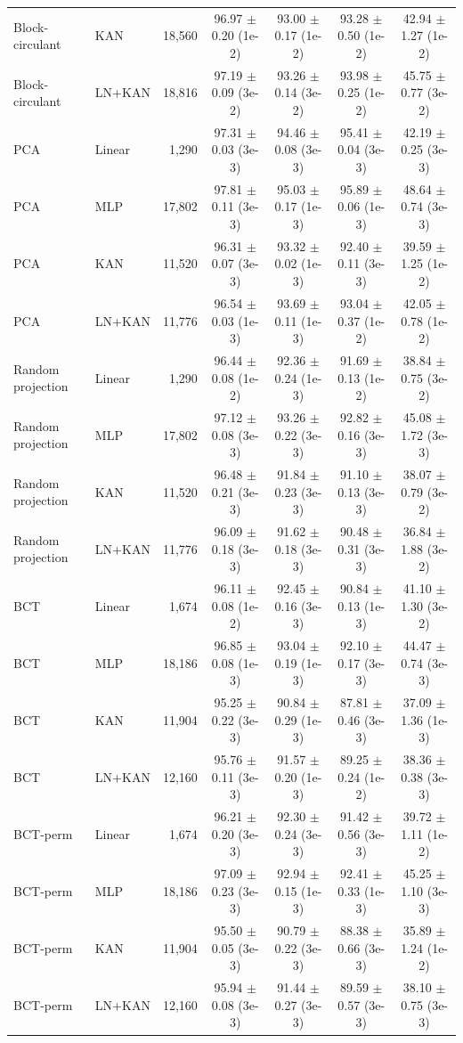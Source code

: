 \documentclass[10pt]{article}
\begin{document}
\begin{longtable}{llrcccc}
Block-circulant & KAN & 18,560 & 96.97 $\pm$ 0.20 (1e-2) & 93.00 $\pm$ 0.17 (1e-2) & 93.28 $\pm$ 0.50 (1e-2) & 42.94 $\pm$ 1.27 (1e-2) \\
Block-circulant & LN+KAN & 18,816 & 97.19 $\pm$ 0.09 (3e-2) & 93.26 $\pm$ 0.14 (3e-2) & 93.98 $\pm$ 0.25 (1e-2) & 45.75 $\pm$ 0.77 (3e-2) \\
\midrule
PCA & Linear & 1,290 & 97.31 $\pm$ 0.03 (3e-3) & 94.46 $\pm$ 0.08 (3e-3) & 95.41 $\pm$ 0.04 (3e-3) & 42.19 $\pm$ 0.25 (3e-3) \\
PCA & MLP & 17,802 & 97.81 $\pm$ 0.11 (3e-3) & 95.03 $\pm$ 0.17 (1e-3) & 95.89 $\pm$ 0.06 (1e-3) & 48.64 $\pm$ 0.74 (3e-3) \\
PCA & KAN & 11,520 & 96.31 $\pm$ 0.07 (3e-3) & 93.32 $\pm$ 0.02 (1e-3) & 92.40 $\pm$ 0.11 (3e-3) & 39.59 $\pm$ 1.25 (1e-2) \\
PCA & LN+KAN & 11,776 & 96.54 $\pm$ 0.03 (1e-3) & 93.69 $\pm$ 0.11 (1e-3) & 93.04 $\pm$ 0.37 (1e-2) & 42.05 $\pm$ 0.78 (1e-2) \\
\midrule
Random projection & Linear & 1,290 & 96.44 $\pm$ 0.08 (1e-2) & 92.36 $\pm$ 0.24 (1e-3) & 91.69 $\pm$ 0.13 (1e-2) & 38.84 $\pm$ 0.75 (3e-2) \\
Random projection & MLP & 17,802 & 97.12 $\pm$ 0.08 (3e-3) & 93.26 $\pm$ 0.22 (3e-3) & 92.82 $\pm$ 0.16 (3e-3) & 45.08 $\pm$ 1.72 (3e-3) \\
Random projection & KAN & 11,520 & 96.48 $\pm$ 0.21 (3e-3) & 91.84 $\pm$ 0.23 (3e-3) & 91.10 $\pm$ 0.13 (3e-3) & 38.07 $\pm$ 0.79 (3e-2) \\
Random projection & LN+KAN & 11,776 & 96.09 $\pm$ 0.18 (3e-3) & 91.62 $\pm$ 0.18 (3e-3) & 90.48 $\pm$ 0.31 (3e-3) & 36.84 $\pm$ 1.88 (3e-2) \\
\midrule
BCT & Linear & 1,674 & 96.11 $\pm$ 0.08 (1e-2) & 92.45 $\pm$ 0.16 (3e-3) & 90.84 $\pm$ 0.13 (1e-3) & 41.10 $\pm$ 1.30 (3e-2) \\
BCT & MLP & 18,186 & 96.85 $\pm$ 0.08 (1e-3) & 93.04 $\pm$ 0.19 (1e-3) & 92.10 $\pm$ 0.17 (3e-3) & 44.47 $\pm$ 0.74 (3e-3) \\
BCT & KAN & 11,904 & 95.25 $\pm$ 0.22 (3e-3) & 90.84 $\pm$ 0.29 (1e-3) & 87.81 $\pm$ 0.46 (3e-3) & 37.09 $\pm$ 1.36 (1e-3) \\
BCT & LN+KAN & 12,160 & 95.76 $\pm$ 0.11 (3e-3) & 91.57 $\pm$ 0.20 (1e-3) & 89.25 $\pm$ 0.24 (1e-2) & 38.36 $\pm$ 0.38 (3e-3) \\
\midrule
BCT-perm & Linear & 1,674 & 96.21 $\pm$ 0.20 (3e-3) & 92.30 $\pm$ 0.24 (3e-3) & 91.42 $\pm$ 0.56 (3e-3) & 39.72 $\pm$ 1.11 (1e-2) \\
BCT-perm & MLP & 18,186 & 97.09 $\pm$ 0.23 (3e-3) & 92.94 $\pm$ 0.15 (1e-3) & 92.41 $\pm$ 0.33 (1e-3) & 45.25 $\pm$ 1.10 (3e-3) \\
BCT-perm & KAN & 11,904 & 95.50 $\pm$ 0.05 (3e-3) & 90.79 $\pm$ 0.22 (3e-3) & 88.38 $\pm$ 0.66 (3e-3) & 35.89 $\pm$ 1.24 (1e-2) \\
BCT-perm & LN+KAN & 12,160 & 95.94 $\pm$ 0.08 (3e-3) & 91.44 $\pm$ 0.27 (3e-3) & 89.59 $\pm$ 0.57 (3e-3) & 38.10 $\pm$ 0.75 (3e-3) \\
\end{longtable}
\end{document}

